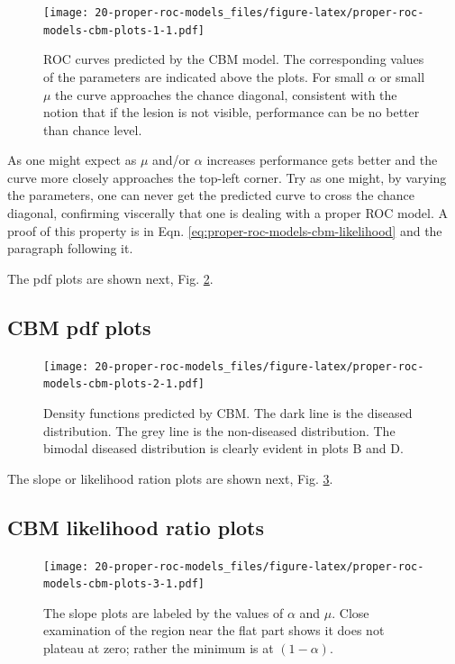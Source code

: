 \documentclass[
]{book}
\begin{document}
\begin{figure}
\centering
\texttt{[image: 20-proper-roc-models\_files/figure-latex/proper-roc-models-cbm-plots-1-1.pdf]}
\caption{\label{fig:proper-roc-models-cbm-plots-1}ROC curves predicted by the CBM model. The corresponding values of the parameters are indicated above the plots. For small \(\alpha\) or small \(\mu\) the curve approaches the chance diagonal, consistent with the notion that if the lesion is not visible, performance can be no better than chance level.}
\end{figure}

As one might expect as \(\mu\) and/or \(\alpha\) increases performance gets better and the curve more closely approaches the top-left corner. Try as one might, by varying the parameters, one can never get the predicted curve to cross the chance diagonal, confirming viscerally that one is dealing with a proper ROC model. A proof of this property is in Eqn. \eqref{eq:proper-roc-models-cbm-likelihood} and the paragraph following it.

The pdf plots are shown next, Fig. \ref{fig:proper-roc-models-cbm-plots-2}.

\hypertarget{proper-roc-models-cbm-pdfs}{%
\subsection{CBM pdf plots}\label{proper-roc-models-cbm-pdfs}}

\begin{figure}
\centering
\texttt{[image: 20-proper-roc-models\_files/figure-latex/proper-roc-models-cbm-plots-2-1.pdf]}
\caption{\label{fig:proper-roc-models-cbm-plots-2}Density functions predicted by CBM. The dark line is the diseased distribution. The grey line is the non-diseased distribution. The bimodal diseased distribution is clearly evident in plots B and D.}
\end{figure}

The slope or likelihood ration plots are shown next, Fig. \ref{fig:proper-roc-models-cbm-plots-3}.

\hypertarget{proper-roc-models-cbm-slopes}{%
\subsection{CBM likelihood ratio plots}\label{proper-roc-models-cbm-slopes}}

\begin{figure}
\centering
\texttt{[image: 20-proper-roc-models\_files/figure-latex/proper-roc-models-cbm-plots-3-1.pdf]}
\caption{\label{fig:proper-roc-models-cbm-plots-3}The slope plots are labeled by the values of \(\alpha\) and \(\mu\). Close examination of the region near the flat part shows it does not plateau at zero; rather the minimum is at \((1 - \alpha)\).}
\end{figure}
\end{document}
